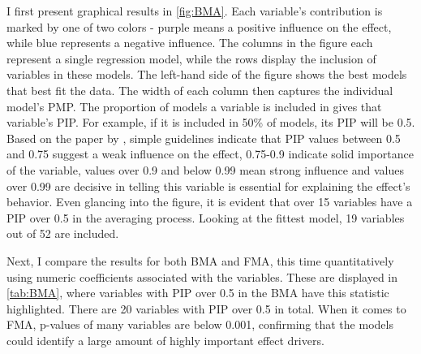 I first present graphical results in \autoref{fig:BMA}. Each variable's contribution is marked by one of two colors - purple means a positive influence on the effect, while blue represents a negative influence. The columns in the figure each represent a single regression model, while the rows display the inclusion of variables in these models. The left-hand side of the figure shows the best models that best fit the data. The width of each column then captures the individual model's \ac{PMP}. The proportion of models a variable is included in gives that variable's \ac{PIP}. For example, if it is included in 50\% of models, its \ac{PIP} will be 0.5. Based on the paper by \cite{kass1995bayes}, simple guidelines indicate that \ac{PIP} values between 0.5 and 0.75 suggest a weak influence on the effect, 0.75-0.9 indicate solid importance of the variable, values over 0.9 and below 0.99 mean strong influence and values over 0.99 are decisive in telling this variable is essential for explaining the effect's behavior. Even glancing into the figure, it is evident that over 15 variables have a \ac{PIP} over 0.5 in the averaging process. Looking at the fittest model, 19 variables out of 52 are included.

Next, I compare the results for both \ac{BMA} and \ac{FMA}, this time quantitatively using numeric coefficients associated with the variables. These are displayed in \autoref{tab:BMA}, where variables with \ac{PIP} over 0.5 in the \ac{BMA} have this statistic highlighted. There are 20 variables with \ac{PIP} over 0.5 in total. When it comes to \ac{FMA}, p-values of many variables are below 0.001, confirming that the models could identify a large amount of highly important effect drivers.


